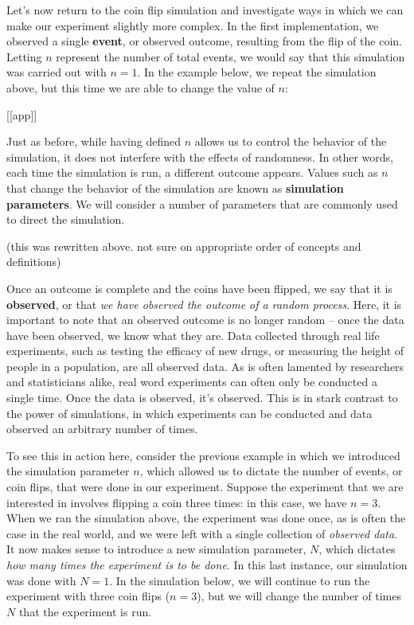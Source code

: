\documentclass[
]{book}
\theoremstyle{definition}
\theoremstyle{definition}
\theoremstyle{definition}
\theoremstyle{remark}
\begin{document}
Let's now return to the coin flip simulation and investigate ways in which we can make our experiment slightly more complex. In the first implementation, we observed a single \textbf{event}, or observed outcome, resulting from the flip of the coin. Letting \(n\) represent the number of total events, we would say that this simulation was carried out with \(n = 1\). In the example below, we repeat the simulation above, but this time we are able to change the value of \(n\):

{[}{[}app{]}{]}

Just as before, while having defined \(n\) allows us to control the behavior of the simulation, it does not interfere with the effects of randomness. In other words, each time the simulation is run, a different outcome appears. Values such as \(n\) that change the behavior of the simulation are known as \textbf{simulation parameters}. We will consider a number of parameters that are commonly used to direct the simulation.

(this was rewritten above. not sure on appropriate order of concepts and definitions)

Once an outcome is complete and the coins have been flipped, we say that it is \textbf{observed}, or that \emph{we have observed the outcome of a random process}. Here, it is important to note that an observed outcome is no longer random -- once the data have been observed, we know what they are. Data collected through real life experiments, such as testing the efficacy of new drugs, or measuring the height of people in a population, are all observed data. As is often lamented by researchers and statisticians alike, real word experiments can often only be conducted a single time. Once the data is observed, it's observed. This is in stark contrast to the power of simulations, in which experiments can be conducted and data observed an arbitrary number of times.

To see this in action here, consider the previous example in which we introduced the simulation parameter \(n\), which allowed us to dictate the number of events, or coin flips, that were done in our experiment. Suppose the experiment that we are interested in involves flipping a coin three times: in this case, we have \(n = 3\). When we ran the simulation above, the experiment was done once, as is often the case in the real world, and we were left with a single collection of \emph{observed data}. It now makes sense to introduce a new simulation parameter, \(N\), which dictates \emph{how many times the experiment is to be done}. In this last instance, our simulation was done with \(N = 1\). In the simulation below, we will continue to run the experiment with three coin flips (\(n = 3\)), but we will change the number of times \(N\) that the experiment is run.
\end{document}
